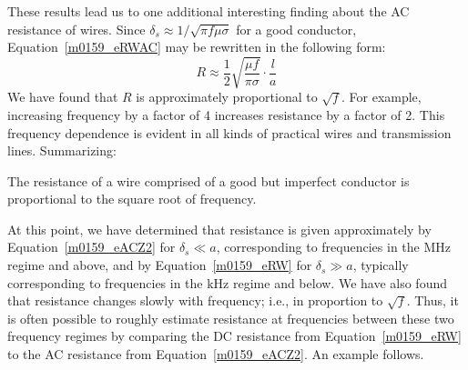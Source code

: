 These results lead us to one additional interesting finding about the AC resistance of wires.
Since $\delta_s \approx 1/\sqrt{\pi f \mu\sigma}$ for a good conductor, 
Equation~\ref{m0159_eRWAC} may be rewritten in the following form:
%
\begin{equation}
\boxed{
R \approx \frac{1}{2} \sqrt{\frac{\mu f}{\pi \sigma}} \cdot \frac{l}{a}
}
\label{m0159_eACZ2}
\end{equation}
%
We have found that $R$ is approximately proportional to $\sqrt{f}$.  
For example, increasing frequency by a factor of 4 increases resistance by a factor of 2.  
This frequency dependence is evident in all kinds of practical wires and transmission lines.
Summarizing:
%
\begin{mdframed}[backgroundcolor=yellow!20,nobreak=true] 
The resistance of a wire comprised of a good but imperfect conductor is proportional to the square root of frequency.
\end{mdframed}

At this point, we have determined that resistance is given approximately by Equation~\ref{m0159_eACZ2} for $\delta_s \ll a$, corresponding to frequencies in the MHz regime and above, and by Equation~\ref{m0159_eRW} for $\delta_s \gg a$, typically corresponding to frequencies in the kHz regime and below.  We have also found that resistance changes slowly with frequency; i.e., in proportion to $\sqrt{f}$. 
Thus, it is often possible to roughly estimate resistance at frequencies between these two frequency regimes by comparing the DC resistance from Equation~\ref{m0159_eRW} to the AC resistance from Equation~\ref{m0159_eACZ2}.  An example follows.

